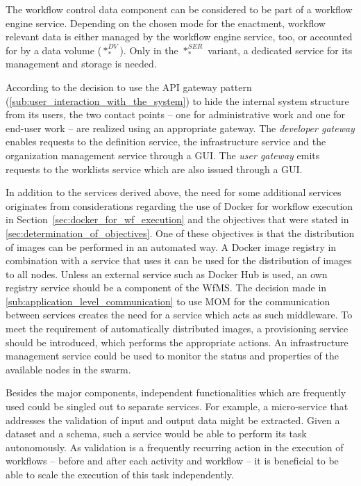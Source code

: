   The workflow control data component can be considered to be part of a workflow engine service.
  Depending on the chosen mode for the enactment, workflow relevant data is either managed by the workflow engine service, too, or accounted for by a data volume ($*_{*}^{DV}$). Only in the $*_{*}^{SER}$ variant, a dedicated service for its management and storage is needed.

  According to the decision to use the \ac{API} gateway pattern (\ref{sub:user_interaction_with_the_system}) to hide the internal system structure from its users, the two contact points -- one for administrative work and one for end-user work -- are realized using an appropriate gateway. The \emph{developer gateway} enables requests to the definition service, the infrastructure service and the organization management service through a \ac{GUI}. The \emph{user gateway} emits requests to the worklists service which are also issued through a \ac{GUI}.

  In addition to the services derived above, the need for some additional services originates from considerations regarding the use of Docker for workflow execution in Section~\ref{sec:docker_for_wf_execution} and the objectives that were stated in \ref{sec:determination_of_objectives}.
  One of these objectives is that the distribution of images can be performed in an automated way. A Docker image registry in combination with a service that uses it can be used for the distribution of images to all nodes. Unless an external service such as Docker Hub is used, an own registry service should be a component of the \ac{WfMS}.
  The decision made in \ref{sub:application_level_communication} to use \ac{MOM} for the communication between services creates the need for a service which acts as such middleware.
  To meet the requirement of automatically distributed images, a provisioning service should be introduced, which performs the appropriate actions. An infrastructure management service could be used to monitor the status and properties of the available nodes in the swarm.

  Besides the major components, independent functionalities which are frequently used could be singled out to separate services. For example, a micro-service that addresses the validation of input and output data might be extracted. Given a dataset and a schema, such a service would be able to perform its task autonomously. As validation is a frequently recurring action in the execution of workflows -- before and after each activity and workflow -- it is beneficial to be able to scale the execution of this task independently.

